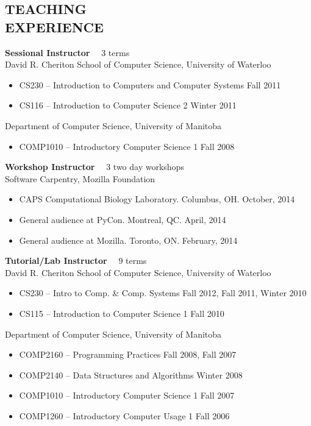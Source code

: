 \documentclass[line,margin]{res}
\begin{document}
\begin{resume}
\section{TEACHING \\EXPERIENCE}

{\bf Sessional Instructor} ~~3 terms \vspace{4pt} \\
David R. Cheriton School of Computer Science, University of Waterloo
\begin{itemize}  \itemsep -2pt
  \item CS230 -- Introduction to Computers and Computer Systems \hfill Fall 2011
  \item CS116 -- Introduction to Computer Science 2 \hfill Winter 2011
\end{itemize} \vspace{-4pt}
Department of Computer Science, University of Manitoba
\begin{itemize}  \itemsep -2pt
  \item COMP1010 -- Introductory Computer Science 1 \hfill Fall 2008
\end{itemize}

\clearpage

{\bf Workshop Instructor} ~~3 two day workshops \vspace{4pt} \\
Software Carpentry, Mozilla Foundation

\begin{itemize} \itemsep -2pt
  \item CAPS Computational Biology Laboratory. Columbus, OH. \hfill
    October, 2014
  \item General audience at PyCon. Montreal, QC. \hfill April, 2014
  \item General audience at Mozilla. Toronto, ON. \hfill February, 2014
\end{itemize}

{\bf Tutorial/Lab Instructor} ~~9 terms \vspace{4pt} \\
David R. Cheriton School of Computer Science, University of Waterloo
\begin{itemize}  \itemsep -2pt
  \item CS230 -- Intro to Comp. \& Comp. Systems \hfill Fall 2012, Fall 2011, Winter 2010
  \item CS115 -- Introduction to Computer Science 1 \hfill Fall 2010
\end{itemize} \vspace{-4pt}
Department of Computer Science, University of Manitoba
\begin{itemize}  \itemsep -2pt
  \item COMP2160 -- Programming Practices \hfill Fall 2008, Fall 2007
  \item COMP2140 -- Data Structures and Algorithms \hfill Winter 2008
  \item COMP1010 -- Introductory Computer Science 1 \hfill Fall 2007
  \item COMP1260 -- Introductory Computer Usage 1 \hfill Fall 2006
\end{itemize}


\end{resume}
\end{document}
